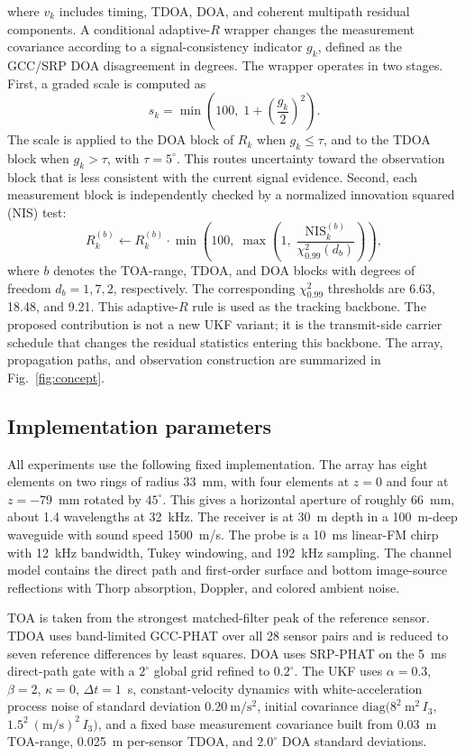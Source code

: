 \documentclass[journal]{IEEEtran}
\begin{document}
where $v_k$ includes timing, TDOA, DOA, and coherent multipath residual components. A conditional
adaptive-$R$ wrapper changes the measurement covariance according to a signal-consistency
indicator $g_k$, defined as the GCC/SRP DOA disagreement in degrees. The wrapper operates in two
stages. First, a graded scale is computed as
\begin{equation}
s_k=\min\!\left(100,\;1+\left(\frac{g_k}{2}\right)^{2}\right).
\end{equation}
The scale is applied to the DOA block of $R_k$ when $g_k\le\tau$, and to the TDOA block when
$g_k>\tau$, with $\tau=5^{\circ}$. This routes uncertainty toward the observation block that is
less consistent with the current signal evidence. Second, each measurement block is independently
checked by a normalized innovation squared (NIS) test:
\begin{equation}
R_k^{(b)}\leftarrow
R_k^{(b)}\cdot\min\!\left(100,\;\max\!\left(1,\;\frac{\mathrm{NIS}_k^{(b)}}{\chi^2_{0.99}(d_b)}\right)\right),
\end{equation}
where $b$ denotes the TOA-range, TDOA, and DOA blocks with degrees of freedom $d_b=1,7,2$,
respectively. The corresponding $\chi^2_{0.99}$ thresholds are 6.63, 18.48, and 9.21. This
adaptive-$R$ rule is used as the tracking backbone. The proposed contribution is not a new UKF
variant; it is the transmit-side carrier schedule that changes the residual statistics entering
this backbone. The array, propagation paths, and observation construction are summarized in
Fig.~\ref{fig:concept}.

\subsection{Implementation parameters}
All experiments use the following fixed implementation. The array has eight elements on two rings
of radius 33~mm, with four elements at $z=0$ and four at $z=-79$~mm rotated by $45^{\circ}$. This
gives a horizontal aperture of roughly 66~mm, about 1.4 wavelengths at 32~kHz. The receiver is at
30~m depth in a 100~m-deep waveguide with sound speed 1500~m/s. The probe is a 10~ms linear-FM
chirp with 12~kHz bandwidth, Tukey windowing, and 192~kHz sampling. The channel model contains
the direct path and first-order surface and bottom image-source reflections with Thorp
absorption, Doppler, and colored ambient noise.

TOA is taken from the strongest matched-filter peak of the reference sensor. TDOA uses
band-limited GCC-PHAT over all 28 sensor pairs and is reduced to seven reference differences by
least squares. DOA uses SRP-PHAT on the 5~ms direct-path gate with a $2^{\circ}$ global grid
refined to $0.2^{\circ}$. The UKF uses $\alpha=0.3$, $\beta=2$, $\kappa=0$, $\Delta t=1$~s,
constant-velocity dynamics with white-acceleration process noise of standard deviation
$0.20~\mathrm{m/s^2}$, initial covariance $\mathrm{diag}(8^2~\mathrm{m^2}\,I_3,$
$1.5^2~\mathrm{(m/s)^2}\,I_3)$, and a fixed base measurement covariance built from
0.03~m TOA-range, 0.025~m per-sensor TDOA, and $2.0^{\circ}$ DOA standard deviations.
\end{document}
